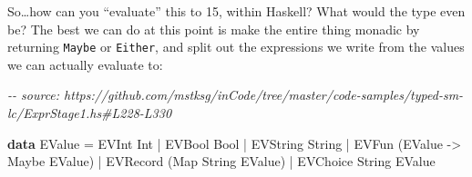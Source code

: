 \documentclass[]{article}
\newenvironment{Shaded}{}{}
\newcommand{\CommentTok}[1]{\textcolor[rgb]{0.38,0.63,0.69}{\textit{#1}}}
\newcommand{\DataTypeTok}[1]{\textcolor[rgb]{0.56,0.13,0.00}{#1}}
\newcommand{\KeywordTok}[1]{\textcolor[rgb]{0.00,0.44,0.13}{\textbf{#1}}}
\newcommand{\NormalTok}[1]{#1}
\newcommand{\OperatorTok}[1]{\textcolor[rgb]{0.40,0.40,0.40}{#1}}
\newcommand{\OtherTok}[1]{\textcolor[rgb]{0.00,0.44,0.13}{#1}}
\begin{document}
So\ldots how can you ``evaluate'' this to 15, within Haskell? What would the
type even be? The best we can do at this point is make the entire thing monadic
by returning \texttt{Maybe} or \texttt{Either}, and split out the expressions we
write from the values we can actually evaluate to:

\begin{Shaded}
\begin{Highlighting}[]
\CommentTok{{-}{-} source: https://github.com/mstksg/inCode/tree/master/code{-}samples/typed{-}sm{-}lc/ExprStage1.hs\#L228{-}L330}

\KeywordTok{data} \DataTypeTok{EValue}
  \OtherTok{=} \DataTypeTok{EVInt} \DataTypeTok{Int}
  \OperatorTok{|} \DataTypeTok{EVBool} \DataTypeTok{Bool}
  \OperatorTok{|} \DataTypeTok{EVString} \DataTypeTok{String}
  \OperatorTok{|} \DataTypeTok{EVFun}\NormalTok{ (}\DataTypeTok{EValue} \OtherTok{{-}\textgreater{}} \DataTypeTok{Maybe} \DataTypeTok{EValue}\NormalTok{)}
  \OperatorTok{|} \DataTypeTok{EVRecord}\NormalTok{ (}\DataTypeTok{Map} \DataTypeTok{String} \DataTypeTok{EValue}\NormalTok{)}
  \OperatorTok{|} \DataTypeTok{EVChoice} \DataTypeTok{String} \DataTypeTok{EValue}


\end{Highlighting}
\end{Shaded}
\end{document}
